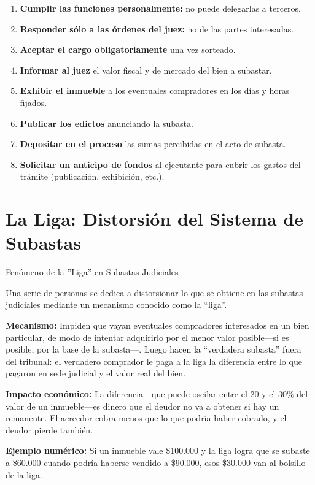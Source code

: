 \documentclass[12pt,oneside]{book}
\begin{document}
\begin{enumerate}
    \item \textbf{Cumplir las funciones personalmente:} no puede delegarlas a terceros.
    \item \textbf{Responder sólo a las órdenes del juez:} no de las partes interesadas.
    \item \textbf{Aceptar el cargo obligatoriamente} una vez sorteado.
    \item \textbf{Informar al juez} el valor fiscal y de mercado del bien a subastar.
    \item \textbf{Exhibir el inmueble} a los eventuales compradores en los días y horas fijados.
    \item \textbf{Publicar los edictos} anunciando la subasta.
    \item \textbf{Depositar en el proceso} las sumas percibidas en el acto de subasta.
    \item \textbf{Solicitar un anticipo de fondos} al ejecutante para cubrir los gastos del trámite (publicación, exhibición, etc.).
\end{enumerate}

\section{La Liga: Distorsión del Sistema de Subastas}

\begin{example}{Fenómeno de la ''Liga'' en Subastas Judiciales}

Una serie de personas se dedica a distorsionar lo que se obtiene en las subastas judiciales mediante un mecanismo conocido como la ``liga''.

\textbf{Mecanismo:} Impiden que vayan eventuales compradores interesados en un bien particular, de modo de intentar adquirirlo por el menor valor posible---si es posible, por la base de la subasta---. Luego hacen la ``verdadera subasta'' fuera del tribunal: el verdadero comprador le paga a la liga la diferencia entre lo que pagaron en sede judicial y el valor real del bien.

\textbf{Impacto económico:} La diferencia---que puede oscilar entre el 20 y el 30\% del valor de un inmueble---es dinero que el deudor no va a obtener si hay un remanente. El acreedor cobra menos que lo que podría haber cobrado, y el deudor pierde también.

\textbf{Ejemplo numérico:} Si un inmueble vale \$100.000 y la liga logra que se subaste a \$60.000 cuando podría haberse vendido a \$90.000, esos \$30.000 van al bolsillo de la liga.
\end{example}
\end{document}
